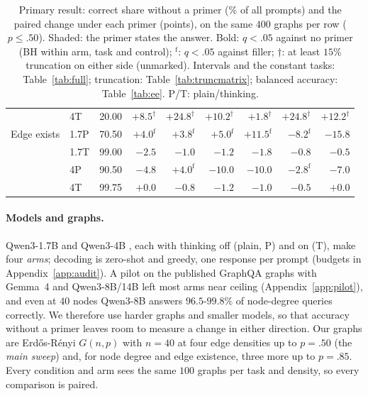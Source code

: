 \documentclass[11pt]{article}
\begin{document}
\begin{table}[t]
\begin{tabular}{llrrrrrrr}
 & 4T & 20.00 & \cellcolor{black!12}$+8.5^{\dagger}$ & $+24.8^{\dagger}$ & $+10.2^{\dagger}$ & \cellcolor{black!12}$+1.8^{\dagger}$ & $+24.8^{\dagger}$ & $+12.2^{\dagger}$\\ %
\addlinespace[2pt]
Edge exists & 1.7P & 70.50 & $+4.0^{\mathrm{f}}$ & $+3.8^{\mathrm{f}}$ & $+5.0^{\mathrm{f}}$ & $\mathbf{+11.5}^{\mathrm{f}}$ & $\mathbf{-8.2}^{\mathrm{f}}$ & $\mathbf{-15.8}$\\ %
 & 1.7T & 99.00 & $-2.5$ & $-1.0$ & $-1.2$ & $-1.8$ & $-0.8$ & $-0.5$\\ %
 & 4P & 90.50 & $\mathbf{-4.8}$ & $\mathbf{+4.0}^{\mathrm{f}}$ & $\mathbf{-10.0}$ & $\mathbf{-10.0}$ & $-2.8^{\mathrm{f}}$ & $\mathbf{-7.0}$\\ %
 & 4T & 99.75 & $+0.0$ & $-0.8$ & $-1.2$ & $-1.0$ & $-0.5$ & $+0.0$\\ %
\bottomrule
\end{tabular}
\caption{Primary result: correct share without a primer (\% of all prompts) and the paired change under each primer (points), on the same $400$ graphs per row ($p\leq.50$). Shaded: the primer states the answer. Bold: $q<.05$ against no primer (BH within arm, task and control); $^{\mathrm{f}}$: $q<.05$ against filler; $\dagger$: at least $15\%$ truncation on either side (unmarked). Intervals and the constant tasks: Table~\ref{tab:full}; truncation: Table~\ref{tab:truncmatrix}; balanced accuracy: Table~\ref{tab:ee}. P/T: plain/thinking.} %
\label{tab:matrix}
\end{table}

\paragraph{Models and graphs.} Qwen3-1.7B and Qwen3-4B \citep{qwen2025qwen3}, each with thinking off (plain, P) and on (T), make four \emph{arms}; decoding is zero-shot and greedy, one response per prompt (budgets in Appendix~\ref{app:audit}). A pilot on the published GraphQA graphs with Gemma~4 \citep{gemma4} and Qwen3-8B/14B left most arms near ceiling (Appendix~\ref{app:pilot}), and even at $40$ nodes Qwen3-8B answers $96.5$-$99.8\%$ of node-degree queries correctly. We therefore use harder graphs and smaller models, so that accuracy without a primer leaves room to measure a change in either direction. Our graphs are Erd\H{o}s-R\'enyi $G(n,p)$ \citep{erdosrenyi1959random} with $n=40$ at four edge densities up to $p=.50$ (the \emph{main sweep}) and, for node degree and edge existence, three more up to $p=.85$. Every condition and arm sees the same $100$ graphs per task and density, so every comparison is paired. %
\end{document}
